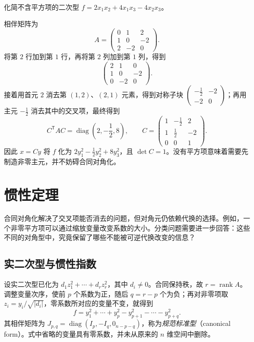 \begin{example}
\label{ex:quadratic-zero-diagonal-pivot}
化简不含平方项的二次型 $f=2x_1x_2+4x_1x_3-4x_2x_3$。
\end{example}
\begin{solve}
相伴矩阵为
\[
    A=\begin{pmatrix}0&1&2\\1&0&-2\\2&-2&0\end{pmatrix}.
\]
将第 $2$ 行加到第 $1$ 行，再将第 $2$ 列加到第 $1$ 列，得到
\[
    \begin{pmatrix}2&1&0\\1&0&-2\\0&-2&0\end{pmatrix}.
\]
接着用首元 $2$ 消去第 $(1,2)$、$(2,1)$ 元素，得到对称子块 $\begin{pmatrix}-\frac12&-2\\-2&0\end{pmatrix}$；再用主元 $-\frac12$ 消去其中的交叉项，最终得到
\[
    C^{\mathsf T}AC=\operatorname{diag}\left(2,-\frac12,8\right),
    \qquad
    C=\begin{pmatrix}1&-\frac12&2\\1&\frac12&-2\\0&0&1\end{pmatrix}.
\]
因此 $x=Cy$ 将 $f$ 化为 $2y_1^2-\frac12y_2^2+8y_3^2$，且 $\det C=1$。没有平方项意味着需要先制造非零主元，并不妨碍合同对角化。
\end{solve}

\section{惯性定理}
\label{sec:quadratic-inertia}

合同对角化解决了交叉项能否消去的问题，但对角元仍依赖代换的选择。例如，一个非零平方项可以通过缩放变量改变系数的大小。分类问题需要进一步回答：这些不同的对角型中，究竟保留了哪些不能被可逆代换改变的信息？

\subsection{实二次型与惯性指数}

设实二次型已化为 $d_1z_1^2+\cdots+d_rz_r^2$，其中 $d_i\ne0$。合同保持秩，故 $r=\operatorname{rank}A$。调整变量次序，使前 $p$ 个系数为正，随后 $q=r-p$ 个为负；再对非零项取 $z_i=y_i/\sqrt{|d_i|}$，零系数所对应的变量不变，就得到
\begin{equation}
\label{eq:real-quadratic-normal-form}
    f=y_1^2+\cdots+y_p^2-y_{p+1}^2-\cdots-y_{p+q}^2.
\end{equation}
其相伴矩阵为 $J_{p,q}=\operatorname{diag}(I_p,-I_q,0_{n-p-q})$，称为\emph{规范标准型}（canonical form）。式中省略的变量具有零系数，并未从原来的 $n$ 维空间中删除。

